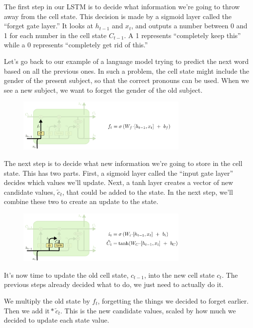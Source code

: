 The first step in our LSTM is to decide what information we’re going to throw away from the cell state. This decision is made by a sigmoid layer called the “forget gate layer.” It looks at $h_{t-1}$ and $x_t$, and outputs a number between 0 and 1 for each number in the cell state $C_{t-1}$. A 1 represents “completely keep this” while a 0 represents “completely get rid of this.”

Let’s go back to our example of a language model trying to predict the next word based on all the previous ones. In such a problem, the cell state might include the gender of the present subject, so that the correct pronouns can be used. When we see a new subject, we want to forget the gender of the old subject.

\begin{figure}[htbp]
	\centering
	\includegraphics[width=0.75\textwidth]{fig/9.png}
\end{figure}

The next step is to decide what new information we’re going to store in the cell state. This has two parts. First, a sigmoid layer called the “input gate layer” decides which values we’ll update. Next, a tanh layer creates a vector of new candidate values, $\tilde{c}_t$, that could be added to the state. In the next step, we’ll combine these two to create an update to the state.

\begin{figure}[htbp]
	\centering
	\includegraphics[width=0.75\textwidth]{fig/10.png}
\end{figure}

It’s now time to update the old cell state, $c_{t−1}$, into the new cell state $c_{t}$. The previous steps already decided what to do, we just need to actually do it.

We multiply the old state by $f_t$, forgetting the things we decided to forget earlier. Then we add $\text{it}*\tilde{c}_t$. This is the new candidate values, scaled by how much we decided to update each state value.

